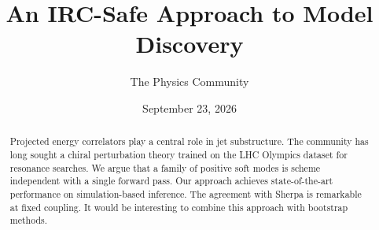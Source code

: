 \documentclass[11pt]{article}
\title{An IRC-Safe Approach to Model Discovery}
\author{The Physics Community}
\date{September 23, 2026}
\begin{document}
\maketitle
\begin{abstract}
Projected energy correlators play a central role in jet substructure.
The community has long sought a chiral perturbation theory trained on
the LHC Olympics dataset for resonance searches. We argue that a family
of positive soft modes is scheme independent with a single forward pass.
Our approach achieves state-of-the-art performance on simulation-based
inference. The agreement with Sherpa is remarkable at fixed coupling. It
would be interesting to combine this approach with bootstrap methods.
\end{abstract}
\tableofcontents



\nocite{*}


\end{document}
